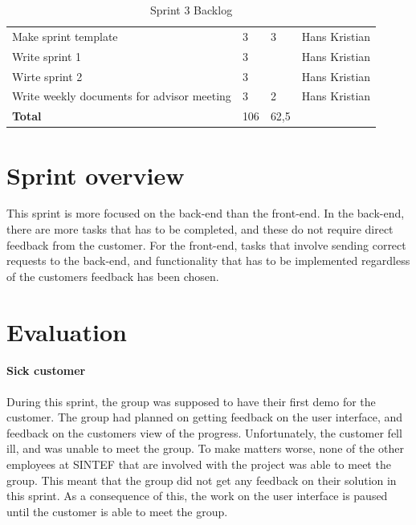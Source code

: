 \documentclass[11pt,a4paper,titlepage,oneside]{report}
\begin{document}
\begin{table}[h]
{\begin{tabular}{llll}
Make sprint template                                                                            & 3                                                                   & 3                                                      & Hans Kristian \\
Write sprint 1                                                                                  & 3                                                                   &                                                        & Hans Kristian \\
Wirte sprint 2                                                                                  & 3                                                                   &                                                        & Hans Kristian \\
Write weekly documents for advisor meeting                                                      & 3                                                                   & 2                                                      & Hans Kristian \\
\rowcolor[HTML]{C0C0C0} 
\textbf{Total}                                                                                  & 106                                                                 & 62,5                                                   &              
\end{tabular}
}
\caption{Sprint 3 Backlog}
\label{tab:Sprint3Backlog}
\end{table}

\section{Sprint overview}
This sprint is more focused on the \gls{back-end} than the \gls{front-end}. In the \gls{back-end}, there are more tasks that has to be completed, and these do not require direct feedback from the customer. For the \gls{front-end}, tasks that involve sending correct requests to the \gls{back-end}, and functionality that has to be implemented regardless of the customers feedback has been chosen. 
\section{Evaluation}
\paragraph{Sick customer}
During this sprint, the group was supposed to have their first demo for the customer. The group had planned on getting feedback on the user interface, and feedback on the customers view of the progress. Unfortunately, the customer fell ill, and was unable to meet the group. To make matters worse, none of the other employees at SINTEF that are involved with the project was able to meet the group. This meant that the group did not get any feedback on their solution in this sprint. As a consequence of this, the work on the user interface is paused until the customer is able to meet the group. 
\end{document}
